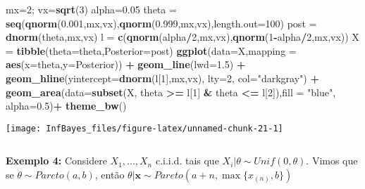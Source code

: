 \documentclass[
]{book}
\newenvironment{Shaded}{\begin{snugshade}}{\end{snugshade}}
\newcommand{\DataTypeTok}[1]{\textcolor[rgb]{0.13,0.29,0.53}{#1}}
\newcommand{\DecValTok}[1]{\textcolor[rgb]{0.00,0.00,0.81}{#1}}
\newcommand{\FloatTok}[1]{\textcolor[rgb]{0.00,0.00,0.81}{#1}}
\newcommand{\KeywordTok}[1]{\textcolor[rgb]{0.13,0.29,0.53}{\textbf{#1}}}
\newcommand{\NormalTok}[1]{#1}
\newcommand{\OperatorTok}[1]{\textcolor[rgb]{0.81,0.36,0.00}{\textbf{#1}}}
\newcommand{\StringTok}[1]{\textcolor[rgb]{0.31,0.60,0.02}{#1}}
\begin{document}
\begin{Shaded}
\begin{Highlighting}[]
\NormalTok{mx=}\DecValTok{2}\NormalTok{; vx=}\KeywordTok{sqrt}\NormalTok{(}\DecValTok{3}\NormalTok{)}
\NormalTok{alpha=}\FloatTok{0.05}
\NormalTok{theta =}\StringTok{ }\KeywordTok{seq}\NormalTok{(}\KeywordTok{qnorm}\NormalTok{(}\FloatTok{0.001}\NormalTok{,mx,vx),}\KeywordTok{qnorm}\NormalTok{(}\FloatTok{0.999}\NormalTok{,mx,vx),}\DataTypeTok{length.out=}\DecValTok{100}\NormalTok{)}
\NormalTok{post =}\StringTok{ }\KeywordTok{dnorm}\NormalTok{(theta,mx,vx)}
\NormalTok{l =}\StringTok{ }\KeywordTok{c}\NormalTok{(}\KeywordTok{qnorm}\NormalTok{(alpha}\OperatorTok{/}\DecValTok{2}\NormalTok{,mx,vx),}\KeywordTok{qnorm}\NormalTok{(}\DecValTok{1}\OperatorTok{-}\NormalTok{alpha}\OperatorTok{/}\DecValTok{2}\NormalTok{,mx,vx))}
\NormalTok{X =}\StringTok{ }\KeywordTok{tibble}\NormalTok{(}\DataTypeTok{theta=}\NormalTok{theta,}\DataTypeTok{Posterior=}\NormalTok{post)}
\KeywordTok{ggplot}\NormalTok{(}\DataTypeTok{data=}\NormalTok{X,}\DataTypeTok{mapping =} \KeywordTok{aes}\NormalTok{(}\DataTypeTok{x=}\NormalTok{theta,}\DataTypeTok{y=}\NormalTok{Posterior)) }\OperatorTok{+}
\StringTok{  }\KeywordTok{geom_line}\NormalTok{(}\DataTypeTok{lwd=}\FloatTok{1.5}\NormalTok{) }\OperatorTok{+}
\StringTok{  }\KeywordTok{geom_hline}\NormalTok{(}\DataTypeTok{yintercept=}\KeywordTok{dnorm}\NormalTok{(l[}\DecValTok{1}\NormalTok{],mx,vx), }\DataTypeTok{lty=}\DecValTok{2}\NormalTok{, }\DataTypeTok{col=}\StringTok{"darkgray"}\NormalTok{) }\OperatorTok{+}
\StringTok{  }\KeywordTok{geom_area}\NormalTok{(}\DataTypeTok{data=}\KeywordTok{subset}\NormalTok{(X, theta }\OperatorTok{>=}\StringTok{ }\NormalTok{l[}\DecValTok{1}\NormalTok{] }\OperatorTok{&}\StringTok{ }\NormalTok{theta }\OperatorTok{<=}\StringTok{ }\NormalTok{l[}\DecValTok{2}\NormalTok{]),}\DataTypeTok{fill =} \StringTok{"blue"}\NormalTok{, }\DataTypeTok{alpha=}\FloatTok{0.5}\NormalTok{)}\OperatorTok{+}
\StringTok{  }\KeywordTok{theme_bw}\NormalTok{()}
\end{Highlighting}
\end{Shaded}

\begin{center}\texttt{[image: InfBayes\_files/figure-latex/unnamed-chunk-21-1]} \end{center}

\(~\)

\textbf{Exemplo 4:} Considere \(X_1,...,X_n\) c.i.i.d. tais que \(X_i|\theta\sim Unif(0,\theta)\). Vimos que se \(\theta\sim Pareto(a,b)\), então \(\theta|\boldsymbol x\sim Pareto (a+n,\max\{x_{(n)},b\})\)
\end{document}
